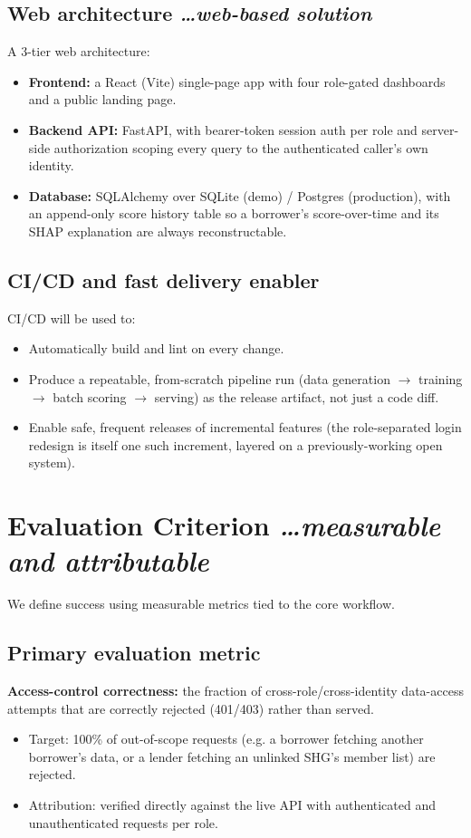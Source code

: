 \documentclass[11pt,a4paper]{article}
\newcommand{\BvrHint}[1]{%
  {\normalfont\normalsize\itshape\hfill #1}}
\begin{document}
\subsection{Web architecture %
\BvrHint{\ldots web-based solution}}
A 3-tier web architecture:
\begin{itemize}[leftmargin=0.7cm]
    \item \textbf{Frontend:} a React (Vite) single-page
    app with four role-gated dashboards and a public
    landing page.
    \item \textbf{Backend API:} FastAPI, with
    bearer-token session auth per role and server-side
    authorization scoping every query to the
    authenticated caller's own identity.
    \item \textbf{Database:} SQLAlchemy over SQLite (demo)
    / Postgres (production), with an append-only score
    history table so a borrower's score-over-time and its
    SHAP explanation are always reconstructable.
\end{itemize}

\subsection{CI/CD and fast delivery enabler}
CI/CD will be used to:
\begin{itemize}[leftmargin=0.7cm]
    \item Automatically build and lint on every change.
    \item Produce a repeatable, from-scratch pipeline run
    (data generation $\to$ training $\to$ batch scoring
    $\to$ serving) as the release artifact, not just a
    code diff.
    \item Enable safe, frequent releases of incremental
    features (the role-separated login redesign is itself
    one such increment, layered on a previously-working
    open system).
\end{itemize}

\section{Evaluation Criterion %
\BvrHint{\ldots measurable and attributable}}
We define success using measurable metrics tied to the
core workflow.

\subsection{Primary evaluation metric}
\textbf{Access-control correctness:} the fraction of
cross-role/cross-identity data-access attempts that are
correctly rejected (401/403) rather than served.
\begin{itemize}[leftmargin=0.7cm]
    \item Target: 100\% of out-of-scope requests (e.g. a
    borrower fetching another borrower's data, or a lender
    fetching an unlinked SHG's member list) are rejected.
    \item Attribution: verified directly against the live
    API with authenticated and unauthenticated requests
    per role.
\end{itemize}
\end{document}
